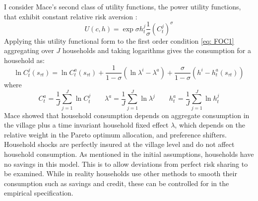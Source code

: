 I consider Mace's second class of utility functions, the power utility functions, that exhibit constant relative risk aversion \citep{Chiappori2011}: 
\begin{equation}
U(c,h)= \exp{\sigma h^j_t}\frac{1}{\sigma}(C^j_t)^{\sigma}
\end{equation}
Applying this utility functional form to the first order condition \eqref{eq: FOC1} aggregating over $J$ households and taking logarithms gives the consumption for a household as:
\begin{equation} \label{eq: consumption}
\ln C_t^j(s_{\tau t}) = \ln C^a_t(s_{\tau t}) + \frac{1}{1-\sigma}(\ln \lambda^i- \lambda^a) + \frac{\sigma}{1-\sigma}(h^i- h^a_t(s_{\tau t}))
\end{equation}
where
\[
C_t^a=\frac{1}{J} \sum_{j=1}^J \ln C_t^j \qquad \lambda^a=\frac{1}{J} \sum_{j=1}^J \ln \lambda^j \qquad  h^a_t=\frac{1}{J} \sum_{j=1}^J \ln h_t^j
\]
Mace showed that household consumption depends on aggregate consumption in the village plus a time invariant household fixed effect $\lambda$, which depends on the relative weight in the Pareto optimum allocation, and preference shifters. Household shocks are perfectly insured at the village level and do not affect household consumption. As mentioned in the initial assumptions, households have no savings in this model. This is to allow deviations from perfect risk sharing to be examined. While in reality households use other methods to smooth their consumption such as savings and credit, these can be controlled for in the empirical specification. 

